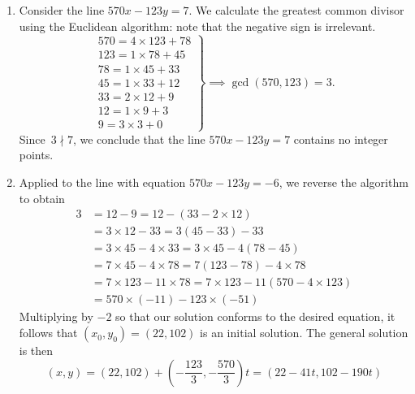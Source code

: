\begin{examples}{}{}
\begin{enumerate}
  \item Consider the line $570x-123y=7$. We calculate the greatest common divisor using the Euclidean algorithm: note that the negative sign is irrelevant.
  \[\renewcommand{\arraystretch}{1.1}\left.\begin{array}{l}
	570=4\times 123+78\\
	123=1\times 78+45\\
	78=1\times 45+33\\
	45=1\times 33+12\\
	33=2\times 12+9\\
	12=1\times 9+3\\
	9=3\times 3+0
  \end{array}\right\}\implies\gcd(570,123)=3.\]
  Since $\,3\nmid 7$, we conclude that the line $570 x-123 y=7$ contains no integer points.
  \item Applied to the line with equation $570x-123y=-6$, we reverse the algorithm to obtain
  \begin{align*}
  3&=12-9=12-(33-2\times 12)\\
  &=3\times 12-33=3(45-33)-33\\
  &=3\times 45-4\times 33=3\times 45-4(78-45)\\
  &=7\times 45-4\times 78=7(123-78)-4\times 78\\
  &=7\times 123-11\times 78=7\times 123-11(570-4\times 123)\\
  &=570\times (-11)-123\times (-51)
  \end{align*}
  Multiplying by $-2$ so that our solution conforms to the desired equation, it follows that $(x_0,y_0)=(22,102)$ is an initial solution. The general solution is then
  \[(x,y)=(22,102)+\left(-\frac{123}3,-\frac{570}3\right)t=(22-41t,102-190t)\]
\end{enumerate}
\end{examples}

% 

